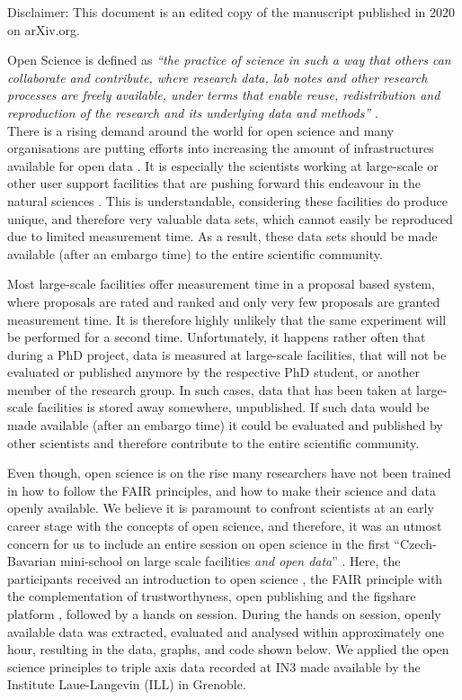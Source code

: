 \documentclass[aps,pra,reprint,amsmath,amssymb,superscriptaddress,showkeys]{revtex4-1}
\begin{document}
Disclaimer: This document is an edited copy of the manuscript published in 2020 on arXiv.org\cite{minischool2020}.

Open Science is defined as \emph{``the practice of science in such a way that others can collaborate and contribute, where research data, lab notes and other research processes are freely available, under terms that enable reuse, redistribution and reproduction of the research and its underlying data and methods''} \cite{foster}.\\

There is a rising demand around the world for open science and many organisations are putting efforts into increasing the amount of infrastructures available for open data \cite{plos, sharing, panosc, nfdi, expands}. 
It is especially the scientists working at large-scale or other user support facilities that are pushing forward this endeavour in the natural sciences \cite{panosc, nfdi, expands}.
This is understandable, considering these facilities do produce unique, and therefore very valuable data sets, which cannot easily be reproduced due to limited measurement time. As a result, these data sets should be made available (after an embargo time) to the entire scientific community. 

Most large-scale facilities offer measurement time in a proposal based system, where proposals are rated and ranked and only very few proposals are granted measurement time.
It is therefore highly unlikely that the same experiment will be performed for a second time. 
Unfortunately, it happens rather often that during a PhD project, data is measured at large-scale facilities, that will not be evaluated or published anymore by the respective PhD student, or another member of the research group.
In such cases, data that has been taken at large-scale facilities is stored away somewhere, unpublished.
If such data would be made available (after an embargo time) it could be evaluated and published by other scientists and therefore contribute to the entire scientific community.

Even though, open science is on the rise many researchers have not been trained in how to follow the FAIR principles, and how to make their science and data openly available.
We believe it is paramount to confront scientists at an early career stage with the concepts of open science, and therefore, it was an utmost concern for us to include an entire session on open science in the first ``Czech-Bavarian mini-school on large scale facilities \emph{and open data}'' \cite{mini-school}.
Here, the participants received an introduction to open science \cite{foster}, the FAIR principle \cite{FAIR} with the complementation of trustworthyness, open publishing \cite{arXiv} and the figshare platform \cite{figshare}, followed by a hands on session.
During the hands on session, openly available data was extracted, evaluated and analysed within approximately one hour, resulting in the data, graphs, and code \cite{data-evaluation, data-docker} shown below.
We applied the open science principles to triple axis data recorded at IN3 \cite{data} made available by the Institute Laue-Langevin (ILL) in Grenoble.
\end{document}
